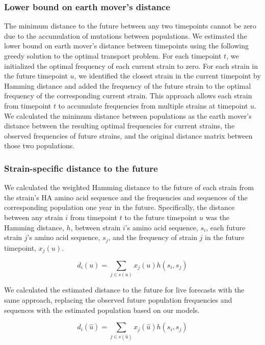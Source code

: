 \documentclass[9pt,lineno]{elife} %
\begin{document}
\subsubsection*{Lower bound on earth mover's distance}

The minimum distance to the future between any two timepoints cannot be zero due to the accumulation of mutations between populations.
We estimated the lower bound on earth mover's distance between timepoints using the following greedy solution to the optimal transport problem.
For each timepoint $t$, we initialized the optimal frequency of each current strain to zero.
For each strain in the future timepoint $u$, we identified the closest strain in the current timepoint by Hamming distance and added the frequency of the future strain to the optimal frequency of the corresponding current strain.
This approach allows each strain from timepoint $t$ to accumulate frequencies from multiple strains at timepoint $u$.
We calculated the minimum distance between populations as the earth mover's distance between the resulting optimal frequencies for current strains, the observed frequencies of future strains, and the original distance matrix between those two populations.

\subsubsection*{Strain-specific distance to the future}

We calculated the weighted Hamming distance to the future of each strain from the strain's HA amino acid sequence and the frequencies and sequences of the corresponding population one year in the future.
Specifically, the distance between any strain $i$ from timepoint $t$ to the future timepoint $u$ was the Hamming distance, $h$, between strain $i$'s amino acid sequence, $s_{i}$, each future strain $j$'s amino acid sequence, $s_{j}$, and the frequency of strain $j$ in the future timepoint, $x_{j}(u)$.

\begin{equation}
  d_{i}(u) = \sum_{j \in s(u)}{x_{j}(u)h(s_{i}, s_{j})}
  \label{equation_observed_weighted_distance_to_future}
\end{equation}

We calculated the estimated distance to the future for live forecasts with the same approach, replacing the observed future population frequencies and sequences with the estimated population based on our models.

\begin{equation}
  d_{i}(\hat{u}) = \sum_{j \in s(\hat{u})}{x_{j}(\hat{u})h(s_{i}, s_{j})}
  \label{equation_estimated_weighted_distance_to_future}
\end{equation}
\end{document}
